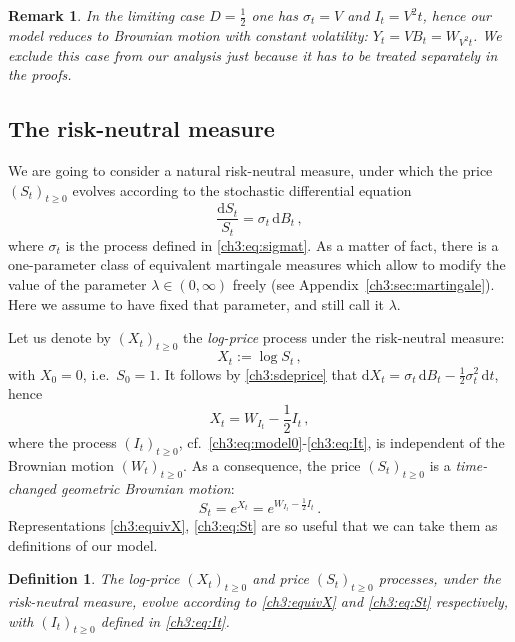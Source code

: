 \documentclass[a4paper,reqno,11pt]{amsart}
\numberwithin{equation}{section}
\newtheorem{remark}[theorem]{Remark}
\newtheorem{definition}[theorem]{Definition}
\newcommand{\dd}{\text{\rm d}}             %
\def\dd{\mathrm{d}}
\begin{document}
\begin{remark}\label{ch3:rem:BS}\rm
In the limiting case $D = \frac{1}{2}$ one has $\sigma_t = V$ and $I_t = V^2 t$,
hence our model reduces to Brownian motion with constant volatility:
$Y_t = V B_t = W_{V^2 t}$. We exclude this case from our analysis just
because it has to be treated separately in the proofs.
\end{remark}


\subsection{The risk-neutral measure}
\label{ch:sec:mart}

We are going to consider a natural risk-neutral measure, 
under which the price $(S_t)_{t\ge 0}$
evolves according to the stochastic differential equation
\begin{equation} \label{ch3:sdeprice}
	\frac{\dd S_t}{S_t} = \sigma_t \, \dd B_t \,,
\end{equation}
where $\sigma_t$ is the process defined in \eqref{ch3:eq:sigmat}.
As a matter of fact, 
there is a one-parameter class of equivalent martingale measures
which allow to modify the value of the parameter $\lambda \in (0,\infty)$
freely (see Appendix~\ref{ch3:sec:martingale}). 
Here we assume to have fixed that parameter, and still call it $\lambda$.

Let us denote by $(X_t)_{t\ge 0}$ the \emph{log-price} process under the risk-neutral measure:
\begin{equation*}
	X_t := \log S_t \,,
\end{equation*}
with $X_0 = 0$, i.e.\ $S_0 = 1$.
It follows by \eqref{ch3:sdeprice} that
$\dd X_t = \sigma_t \, \dd B_t - \frac{1}{2} \sigma_t^2 \, \dd t$, hence
\begin{equation} \label{ch3:equivX}
	X_t = W_{I_t} - \frac{1}{2} I_t \,,
\end{equation}
where the process $(I_t)_{t\ge 0}$,
cf.\ \eqref{ch3:eq:model0}-\eqref{ch3:eq:It},
is independent of the Brownian motion $(W_t)_{t\ge 0}$.
As a consequence, the price $(S_t)_{t\ge 0}$ is
a \emph{time-changed geometric Brownian motion}:
\begin{equation} \label{ch3:eq:St}
	S_t = e^{X_t} = e^{W_{I_t} - \frac{1}{2}I_t} \,.
\end{equation}
Representations \eqref{ch3:equivX}, \eqref{ch3:eq:St} 
are so useful that we can take them as definitions
of our model.

\begin{definition}\label{def:def}
The log-price $(X_t)_{t\ge 0}$ and price $(S_t)_{t\ge 0}$ processes,
under the risk-neutral measure,
evolve according to \eqref{ch3:equivX} and \eqref{ch3:eq:St}
respectively,
with $(I_t)_{t\ge 0}$ defined in \eqref{ch3:eq:It}.
\end{definition}
\end{document}
